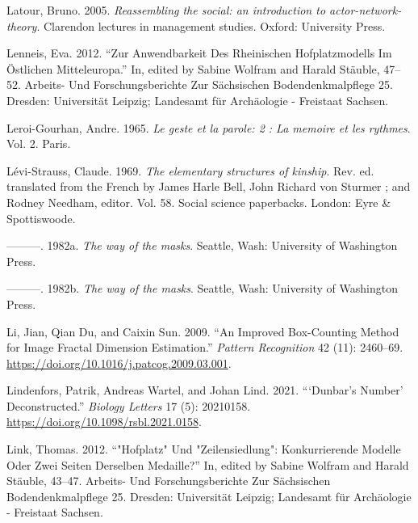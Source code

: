 \documentclass[
  12pt,
  a4paper, twoside]{book}
\newlength{\cslhangindent}
\newlength{\cslentryspacingunit} %
\newenvironment{CSLReferences}[2] %
 {%
  \setlength{\parindent}{0pt}
  \ifodd #1
  \let\oldpar\par
  \def\par{\hangindent=\cslhangindent\oldpar}
  \fi
  \setlength{\parskip}{#2\cslentryspacingunit}
 }%
 {}
\begin{document}
\begin{CSLReferences}{1}{0}
\leavevmode{}%
Latour, Bruno. 2005. \emph{Reassembling the social: an introduction to actor-network-theory}. Clarendon lectures in management studies. Oxford: University Press.

\leavevmode{}%
Lenneis, Eva. 2012. {``Zur Anwendbarkeit Des Rheinischen Hofplatzmodells Im Östlichen Mitteleuropa.''} In, edited by Sabine Wolfram and Harald Stäuble, 47--52. Arbeits- Und Forschungsberichte Zur Sächsischen Bodendenkmalpflege 25. Dresden: Universität Leipzig; Landesamt für Archäologie - Freistaat Sachsen.

\leavevmode{}%
Leroi-Gourhan, Andre. 1965. \emph{Le geste et la parole: 2 : La memoire et les rythmes}. Vol. 2. Paris.

\leavevmode{}%
Lévi-Strauss, Claude. 1969. \emph{The elementary structures of kinship}. Rev. ed. translated from the French by James Harle Bell, John Richard von Sturmer ; and Rodney Needham, editor. Vol. 58. Social science paperbacks. London: Eyre \& Spottiswoode.

\leavevmode{}%
---------. 1982a. \emph{The way of the masks}. Seattle, Wash: University of Washington Press.

\leavevmode{}%
---------. 1982b. \emph{The way of the masks}. Seattle, Wash: University of Washington Press.

\leavevmode{}%
Li, Jian, Qian Du, and Caixin Sun. 2009. {``An Improved Box-Counting Method for Image Fractal Dimension Estimation.''} \emph{Pattern Recognition} 42 (11): 2460--69. \url{https://doi.org/10.1016/j.patcog.2009.03.001}.

\leavevmode{}%
Lindenfors, Patrik, Andreas Wartel, and Johan Lind. 2021. {``{`}Dunbar's Number{'} Deconstructed.''} \emph{Biology Letters} 17 (5): 20210158. \url{https://doi.org/10.1098/rsbl.2021.0158}.

\leavevmode{}%
Link, Thomas. 2012. {``{"}Hofplatz{"} Und {"}Zeilensiedlung{"}: Konkurrierende Modelle Oder Zwei Seiten Derselben Medaille?''} In, edited by Sabine Wolfram and Harald Stäuble, 43--47. Arbeits- Und Forschungsberichte Zur Sächsischen Bodendenkmalpflege 25. Dresden: Universität Leipzig; Landesamt für Archäologie - Freistaat Sachsen.


\end{CSLReferences}
\end{document}

